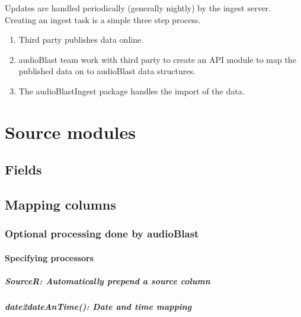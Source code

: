 \documentclass[
]{book}
\begin{document}
Updates are handled periodically (generally nightly) by the ingest server. Creating an ingest task is a simple three step process.

\begin{enumerate}
\def\labelenumi{\arabic{enumi}.}
\item
  Third party publishes data online.
\item
  audioBlast team work with third party to create an API module to map the published data on to audioBlast data structures.
\item
  The audioBlastIngest package handles the import of the data.
\end{enumerate}

\hypertarget{source-modules}{%
\section{Source modules}\label{source-modules}}

\hypertarget{fields}{%
\subsection{Fields}\label{fields}}

\hypertarget{mapping-columns}{%
\subsection{Mapping columns}\label{mapping-columns}}

\hypertarget{optional-processing-done-by-audioblast}{%
\subsubsection{Optional processing done by audioBlast}\label{optional-processing-done-by-audioblast}}

\hypertarget{specifying-processors}{%
\paragraph{Specifying processors}\label{specifying-processors}}

\hypertarget{sourcer-automatically-prepend-a-source-column}{%
\subparagraph{SourceR: Automatically prepend a source column}\label{sourcer-automatically-prepend-a-source-column}}

\hypertarget{date2dateantime-date-and-time-mapping}{%
\subparagraph{date2dateAnTime(): Date and time mapping}\label{date2dateantime-date-and-time-mapping}}
\end{document}

